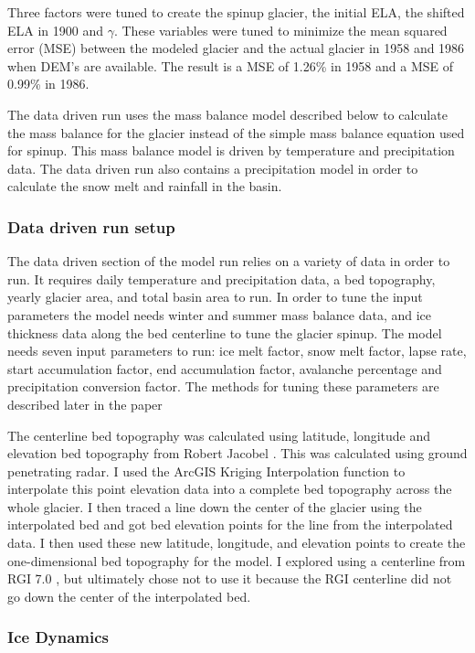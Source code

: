 \documentclass{article}
\begin{document}
Three factors were tuned to create the spinup glacier, the initial ELA, the shifted ELA in 1900 and $\gamma$. These variables were tuned to 
minimize the mean squared error (MSE) between the modeled glacier and the actual glacier in 1958 and 1986 when DEM's are available. The result is 
a MSE of 1.26\% in 1958 and a MSE of 0.99\% in 1986.

The data driven run uses the mass balance model described below to calculate the mass balance for the glacier instead of the simple mass balance 
equation used for spinup. This mass balance model is driven by temperature and precipitation data. The data driven run also contains a precipitation 
model in order to calculate the snow melt and rainfall in the basin.

\subsubsection{Data driven run setup}
The data driven section of the model run relies on a variety of data in order to run. It requires daily temperature and precipitation data, 
a bed topography, yearly glacier area, and total basin area to run. In order to tune the input parameters the model needs winter and summer mass balance 
data, and ice thickness data along the bed centerline to tune the glacier spinup. The model needs seven input parameters to run: ice melt factor, 
snow melt factor, lapse rate, start accumulation factor, end 
accumulation factor, avalanche percentage and precipitation conversion factor. The methods for tuning these parameters are described later in the paper

The centerline bed topography was calculated using latitude, longitude and elevation bed topography from Robert Jacobel \cite{ref4}. This  was calculated using 
ground penetrating radar. I used the ArcGIS \cite{ref5} Kriging Interpolation function to interpolate this point elevation data into a complete 
bed topography across the whole glacier. I then traced a line down the center of the glacier using the interpolated bed and got bed elevation points for the line 
from the interpolated data. I then used these new latitude, longitude, and elevation points to create the one-dimensional bed topography for 
the model. I explored using a centerline from RGI 7.0 \cite{ref6}, but ultimately chose not to use it because the RGI centerline did not go 
down the center of the interpolated bed.

\subsubsection{Ice Dynamics}
\end{document}

